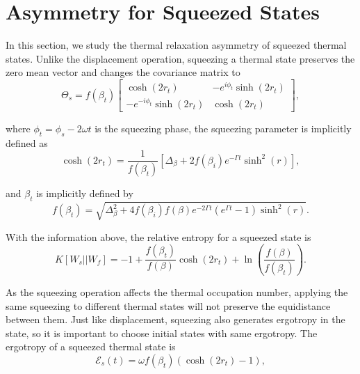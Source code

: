 \section{Asymmetry for Squeezed States}\label{sec:result-squeezed}

In this section, we study the thermal relaxation asymmetry of squeezed thermal states. Unlike the displacement operation, squeezing a thermal state preserves the zero mean vector and changes the covariance matrix to
\begin{equation}
    \Theta_s = f(\beta_t) 
    \begin{bmatrix}
        \cosh(2 r_t) & -e^{i \phi_t} \sinh(2r_t)\\
        -e^{-i \phi_t} \sinh(2r_t) & \cosh(2 r_t)
    \end{bmatrix},
\end{equation}

\noindent where $\phi_t = \phi_s - 2\omega t$ is the squeezing phase, the squeezing parameter is implicitly defined as
\begin{equation}
    \cosh(2r_t) = \frac{1}{f(\beta_t)} [\Delta_\beta + 2f(\beta_i) e^{-\Gamma t} \sinh^2(r)],
    \label{eq:coshrt-squeezing}
\end{equation}

\noindent and $\beta_t$ is implicitly defined by
\begin{equation}
    f(\beta_t) = \sqrt{\Delta_\beta^2 + 4 f(\beta_i) f(\beta) e^{-2\Gamma t} (e^{\Gamma t} - 1) \sinh^2(r)}.
    \label{eq:fbetat-squeezing}
\end{equation}

\noindent With the information above, the relative entropy for a squeezed state is
\begin{equation}
    K[W_s || W_f] = -1 + \frac{f(\beta_t)}{f(\beta)}\cosh(2r_t) + \ln \left( \frac{f(\beta)}{f(\beta_t)} \right).
    \label{eq:relative-entropy-squeezing}
\end{equation}

\noindent As the squeezing operation affects the thermal occupation number, applying the same squeezing to different thermal states will not preserve the equidistance between them. Just like displacement, squeezing also generates ergotropy in the state, so it is important to choose initial states with same ergotropy. The ergotropy of a squeezed thermal state is
\begin{equation}
    \mathcal{E}_s(t) = \omega f(\beta_t) (\cosh (2r_t) - 1),
    \label{eq:ergo-squeezing}
\end{equation}

